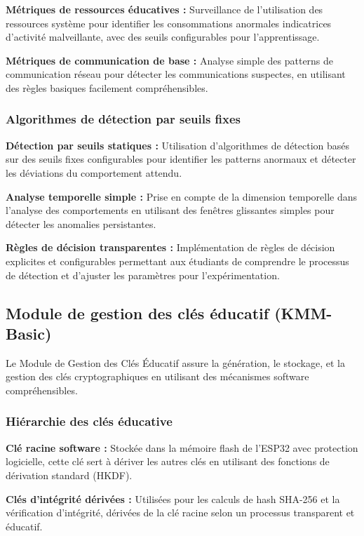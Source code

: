 \textbf{Métriques de ressources éducatives :} Surveillance de l'utilisation des ressources système pour identifier les consommations anormales indicatrices d'activité malveillante, avec des seuils configurables pour l'apprentissage.

\textbf{Métriques de communication de base :} Analyse simple des patterns de communication réseau pour détecter les communications suspectes, en utilisant des règles basiques facilement compréhensibles.

\subsubsection{Algorithmes de détection par seuils fixes}

\textbf{Détection par seuils statiques :} Utilisation d'algorithmes de détection basés sur des seuils fixes configurables pour identifier les patterns anormaux et détecter les déviations du comportement attendu.

\textbf{Analyse temporelle simple :} Prise en compte de la dimension temporelle dans l'analyse des comportements en utilisant des fenêtres glissantes simples pour détecter les anomalies persistantes.

\textbf{Règles de décision transparentes :} Implémentation de règles de décision explicites et configurables permettant aux étudiants de comprendre le processus de détection et d'ajuster les paramètres pour l'expérimentation.

\subsection{Module de gestion des clés éducatif (KMM-Basic)}

Le Module de Gestion des Clés Éducatif assure la génération, le stockage, et la gestion des clés cryptographiques en utilisant des mécanismes software compréhensibles.

\subsubsection{Hiérarchie des clés éducative}

\textbf{Clé racine software :} Stockée dans la mémoire flash de l'ESP32 avec protection logicielle, cette clé sert à dériver les autres clés en utilisant des fonctions de dérivation standard (HKDF).

\textbf{Clés d'intégrité dérivées :} Utilisées pour les calculs de hash SHA-256 et la vérification d'intégrité, dérivées de la clé racine selon un processus transparent et éducatif.

